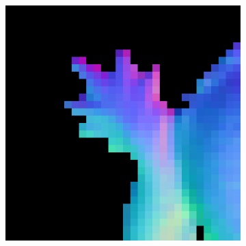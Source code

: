 \begin{figure}[th]
\begin{subfigure}[b]{0.18\linewidth}
	\end{subfigure}
	\begin{subfigure}[b]{0.18\linewidth}
		\includegraphics[width=\linewidth]{./Figures/gcnn_synthetic/eval_7_12_-48_normal.png}
	\end{subfigure}
	

\end{figure}
